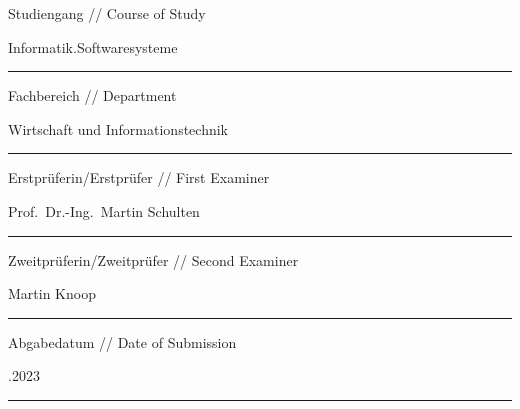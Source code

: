 \begin{titlepage}
        \vskip 0.13cm

        \begingroup
        \fontsize{8pt}{6pt}\selectfont
        Studiengang // Course of Study
        \endgroup

        \vskip 0.03cm

        \begingroup
        \fontsize{12pt}{14pt}\selectfont
        Informatik.Softwaresysteme
        \endgroup

        \vskip -0.05cm

        \noindent\rule{14.4cm}{0.4pt}

        \vskip 0.13cm

        \begingroup
        \fontsize{8pt}{6pt}\selectfont
        Fachbereich // Department
        \endgroup

        \vskip 0.03cm

        \begingroup
        \fontsize{12pt}{14pt}\selectfont
        Wirtschaft und Informationstechnik
        \endgroup

        \vskip -0.05cm

        \noindent\rule{14.4cm}{0.4pt}

        \vskip 0.13cm

        \begingroup
        \fontsize{8pt}{6pt}\selectfont
        Erstprüferin/Erstprüfer // First Examiner
        \endgroup

        \vskip 0.03cm

        \begingroup
        \fontsize{12pt}{14pt}\selectfont
        Prof.\ Dr.-Ing.\ Martin Schulten
        \endgroup

        \vskip -0.05cm

        \noindent\rule{14.4cm}{0.4pt}

        \vskip 0.13cm

        \begingroup
        \fontsize{8pt}{6pt}\selectfont
        Zweitprüferin/Zweitprüfer // Second Examiner
        \endgroup

        \vskip 0.03cm

        \begingroup
        \fontsize{12pt}{14pt}\selectfont
        Martin Knoop
        \endgroup

        \vskip -0.05cm

        \noindent\rule{14.4cm}{0.4pt}

        \vskip 0.13cm

        \begingroup
        \fontsize{8pt}{6pt}\selectfont
        Abgabedatum // Date of Submission
        \endgroup

        \vskip 0.03cm

        \begingroup
        \fontsize{12pt}{14pt}.2023
        \endgroup

        \vskip -0.05cm

        \noindent\rule{14.4cm}{0.4pt}
    \restoregeometry
\end{titlepage}
\clearpage
